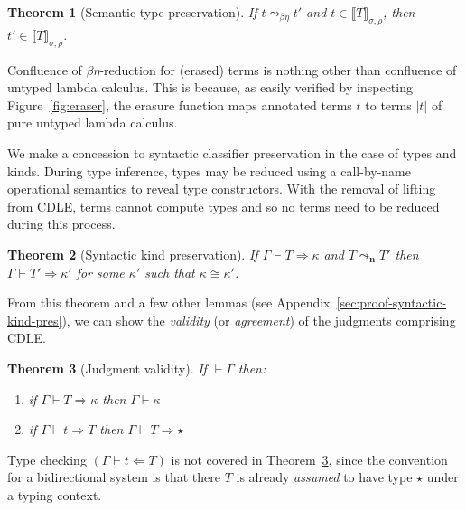 \documentclass{article}
\newcommand{\interp}[1]{\llbracket #1 \rrbracket}
\newcommand{\leadstoc}[0]{\ensuremath{\leadsto_{\mathbf{n}}}}
\newcommand{\tpcheck}[0]{\Leftarrow}
\newcommand{\tpsynth}[0]{\Rightarrow}
\newtheorem{theorem}{Theorem}
\newtheorem{lemma}[theorem]{Lemma}
\begin{document}
\begin{theorem}[Semantic type preservation]
  If $t \leadsto_{\beta\eta} t'$ and $t\in\interp{T}_{\sigma,\rho}$, then $t'\in\interp{T}_{\sigma,\rho}$.
\end{theorem}

  Confluence of $\beta\eta$-reduction for (erased)
  terms is nothing other than confluence of untyped lambda calculus.
  This is because, as easily verified by inspecting
  Figure~\ref{fig:eraser}, the erasure function maps annotated terms
  $t$ to terms $|t|$ of pure untyped lambda calculus.
\begin{comment}
  \begin{lemma}
    If $t$ is an annotated term of CDLE, then $|t|$ is a term of pure untyped lambda calculus.
    \end{lemma}
\end{comment}    

We make a concession to syntactic classifier preservation in the case of types
and kinds.
During type inference, types may be reduced using a call-by-name operational
semantics to reveal type constructors.
With the removal of lifting from CDLE, terms cannot compute types and so no
terms need to be reduced during this process.

\begin{theorem}[Syntactic kind preservation]
  \label{thm:syntactic-kind-pres}
  If \(\Gamma \vdash T \tpsynth \kappa\) and \(T \leadstoc T'\) then
  \(\Gamma \vdash T' \tpsynth \kappa'\) for some \(\kappa'\) such that \(\kappa
  \cong \kappa'\).
\end{theorem}

From this theorem and a few other lemmas (see
Appendix~\ref{sec:proof-syntactic-kind-pres}), we can show the \emph{validity}
(or \emph{agreement}) of the judgments comprising CDLE.

\begin{theorem}[Judgment validity]
  \label{thm:judge-valid}
  If \(\vdash \Gamma\) then:
  \begin{enumerate}
  \item if \(\Gamma \vdash T \tpsynth \kappa\) then \(\Gamma \vdash \kappa\)
    
  \item if \(\Gamma \vdash t \tpsynth T\) then \(\Gamma \vdash T \tpsynth \star\)
  \end{enumerate}
\end{theorem}

Type checking \((\Gamma \vdash t \tpcheck T)\) is not covered in
Theorem~\ref{thm:judge-valid}, since the convention for a bidirectional system
is that there \(T\) is already \emph{assumed} to have type \(\star\) under a
typing context.
\end{document}
